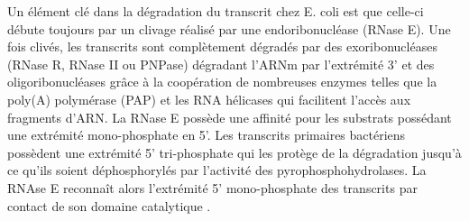 \documentclass[12pt,a4paper]{report}
\begin{document}
\begin{onehalfspace}
Un élément clé dans la dégradation du transcrit chez E. coli est que celle-ci débute toujours par un clivage réalisé par une endoribonucléase (RNase E). Une fois clivés, les transcrits sont complètement dégradés par des exoribonucléases (RNase R, RNase II ou PNPase) dégradant l'ARNm par l'extrémité 3' et des oligoribonucléases grâce à la coopération de nombreuses enzymes telles que la poly(A) polymérase (PAP) et les RNA hélicases qui facilitent l'accès aux fragments d'ARN. La RNase E possède une affinité pour les substrats possédant une extrémité mono-phosphate en 5'. Les transcrits primaires bactériens possèdent une extrémité 5' tri-phosphate qui les protège de la dégradation jusqu'à ce qu'ils soient déphosphorylés par l'activité des pyrophosphohydrolases. La RNAse E reconnaît alors l'extrémité 5' mono-phosphate des transcrits par contact de son domaine catalytique \citep{Callaghan2005,Bandyra2013}.

\begin{figure}
\end{figure}


\end{onehalfspace}
\end{document}
